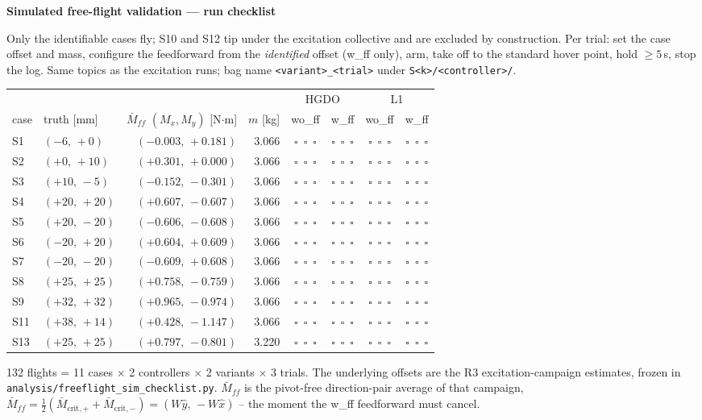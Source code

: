 \documentclass[10pt]{article}
\newcommand{\cb}{$\square$}
\begin{document}
\begin{center}\Large\bfseries Simulated free-flight validation --- run checklist\end{center}
\medskip
Only the identifiable cases fly; S10 and S12 tip under the excitation collective and are excluded by construction. Per trial: set the case offset and mass, configure the feedforward from the \emph{identified} offset (w\_ff only), arm, take off to the standard hover point, hold $\geq 5$\,s, stop the log. Same topics as the excitation runs; bag name \texttt{<variant>\_<trial>} under \texttt{S<k>/<controller>/}.
\medskip

\renewcommand{\arraystretch}{1.45}
\begin{tabular}{l l r r c c c c}
\toprule
 & & & & \multicolumn{2}{c}{HGDO} & \multicolumn{2}{c}{L1} \\
\cmidrule(lr){5-6}\cmidrule(lr){7-8}
case & truth [mm] & $\bar M_{\!f\!f}$ $(M_x, M_y)$ [N$\cdot$m] & $m$ [kg] & wo\_ff & w\_ff & wo\_ff & w\_ff \\
\midrule
S1 & $(-6,\,+0)$ & $(-0.003,\,+0.181)$ & 3.066 & \cb\ \cb\ \cb & \cb\ \cb\ \cb & \cb\ \cb\ \cb & \cb\ \cb\ \cb \\
S2 & $(+0,\,+10)$ & $(+0.301,\,+0.000)$ & 3.066 & \cb\ \cb\ \cb & \cb\ \cb\ \cb & \cb\ \cb\ \cb & \cb\ \cb\ \cb \\
S3 & $(+10,\,-5)$ & $(-0.152,\,-0.301)$ & 3.066 & \cb\ \cb\ \cb & \cb\ \cb\ \cb & \cb\ \cb\ \cb & \cb\ \cb\ \cb \\
S4 & $(+20,\,+20)$ & $(+0.607,\,-0.607)$ & 3.066 & \cb\ \cb\ \cb & \cb\ \cb\ \cb & \cb\ \cb\ \cb & \cb\ \cb\ \cb \\
S5 & $(+20,\,-20)$ & $(-0.606,\,-0.608)$ & 3.066 & \cb\ \cb\ \cb & \cb\ \cb\ \cb & \cb\ \cb\ \cb & \cb\ \cb\ \cb \\
S6 & $(-20,\,+20)$ & $(+0.604,\,+0.609)$ & 3.066 & \cb\ \cb\ \cb & \cb\ \cb\ \cb & \cb\ \cb\ \cb & \cb\ \cb\ \cb \\
S7 & $(-20,\,-20)$ & $(-0.609,\,+0.608)$ & 3.066 & \cb\ \cb\ \cb & \cb\ \cb\ \cb & \cb\ \cb\ \cb & \cb\ \cb\ \cb \\
S8 & $(+25,\,+25)$ & $(+0.758,\,-0.759)$ & 3.066 & \cb\ \cb\ \cb & \cb\ \cb\ \cb & \cb\ \cb\ \cb & \cb\ \cb\ \cb \\
S9 & $(+32,\,+32)$ & $(+0.965,\,-0.974)$ & 3.066 & \cb\ \cb\ \cb & \cb\ \cb\ \cb & \cb\ \cb\ \cb & \cb\ \cb\ \cb \\
S11 & $(+38,\,+14)$ & $(+0.428,\,-1.147)$ & 3.066 & \cb\ \cb\ \cb & \cb\ \cb\ \cb & \cb\ \cb\ \cb & \cb\ \cb\ \cb \\
S13 & $(+25,\,+25)$ & $(+0.797,\,-0.801)$ & 3.220 & \cb\ \cb\ \cb & \cb\ \cb\ \cb & \cb\ \cb\ \cb & \cb\ \cb\ \cb \\
\bottomrule
\end{tabular}
\medskip

132 flights = 11 cases $\times$ 2 controllers $\times$ 2 variants $\times$ 3 trials. The underlying offsets are the R3 excitation-campaign estimates, frozen in \texttt{analysis/freeflight\_sim\_checklist.py}. $\bar M_{\!f\!f}$ is the pivot-free direction-pair average of that campaign, $\bar M_{\!f\!f} = \tfrac12(\bar M_{\mathrm{crit},+} + \bar M_{\mathrm{crit},-}) = (W\hat{y},\,-W\hat{x})$ -- the moment the w\_ff feedforward must cancel.
\end{document}
